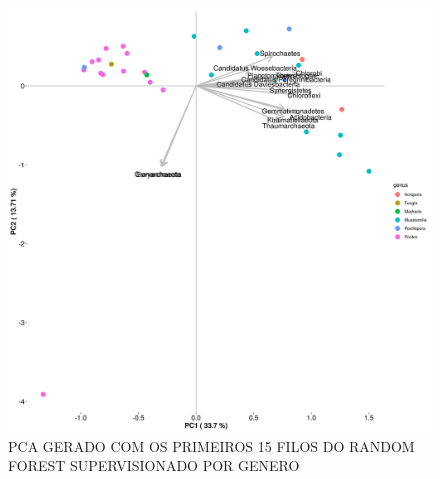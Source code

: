\documentclass[12pt, a4paper]{report}
\begin{document}
\begin{figure}[H]
\centering
\includegraphics[scale=0.4]{figures/pca_corais_mg_rast_rf_supervisionado_genus_15_filos_23_10_2018.jpg}
\caption{PCA GERADO COM OS PRIMEIROS 15 FILOS DO RANDOM FOREST SUPERVISIONADO POR GENERO}
\end{figure}
\end{document}

